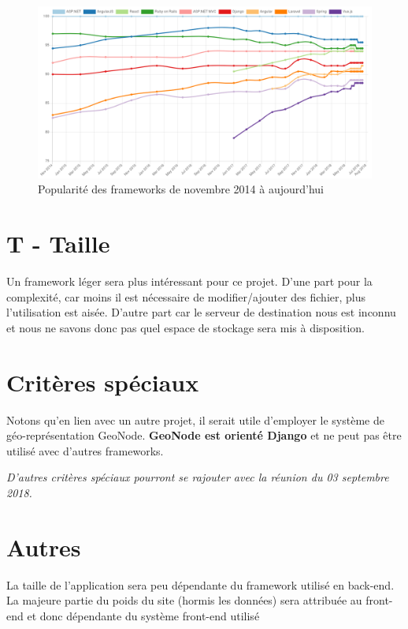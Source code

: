 \documentclass[a4paper, 11pt]{article}
\begin{document}
\begin{figure}
    \centering
    \includegraphics[width=\textwidth]{Etude_Technologique_1/hotframework.png}
    \caption{Popularité des frameworks de novembre 2014 à aujourd'hui}
    \label{fig:hotframework}
\end{figure}

\section*{T - Taille}
Un framework léger sera plus intéressant pour ce projet. D'une part pour la complexité, car moins il est nécessaire de modifier/ajouter des fichier, plus l'utilisation est aisée. D'autre part car le serveur de destination nous est inconnu et nous ne savons donc pas quel espace de stockage sera mis à disposition.

\section*{Critères spéciaux}

Notons qu'en lien avec un autre projet, il serait utile d'employer le système de géo-représentation GeoNode. \textbf{GeoNode est orienté Django} et ne peut pas être utilisé avec d'autres frameworks.

\textit{D'autres critères spéciaux pourront se rajouter avec la réunion du 03 septembre 2018.}

\section*{Autres}

La taille de l'application sera peu dépendante du framework utilisé en back-end. La majeure partie du poids du site (hormis les données) sera attribuée au front-end et donc dépendante du système front-end utilisé
\end{document}
